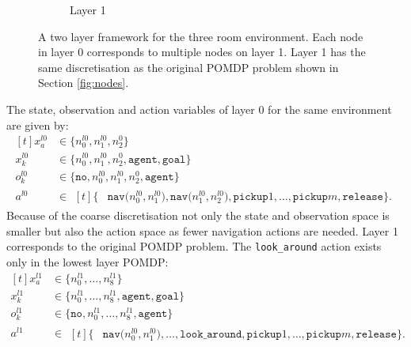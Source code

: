 \begin{figure}
\begin{subfigure}[b]{0.48\textwidth}
        \caption{Layer 1}
        \label{subfig:l1}
    \end{subfigure}
    \caption{A two layer framework for the three room environment. Each node in layer 0 corresponds to multiple nodes on layer 1. Layer 1 has the same discretisation as the original POMDP problem shown in Section \ref{fig:nodes}.}
    \label{fig:two_layers}
\end{figure}
The state, observation and action variables of layer 0 for the same environment are given by:
%
\begin{equation}\label{eq:l0}
    \begin{aligned}[t] 
        x_a^{l0} &\in \big\{n_0^{l0}, n_1^{l0}, n_2^{0}  \big\} \\
        x_k^{l0} &\in  \big\{n_0^{l0}, n_1^{l0}, n_2^{0}, \texttt{agent},\texttt{goal}  \big\}\\
        o_k^{l0} &\in \big\{\texttt{no}, n_0^{l0}, n_1^{l0}, n_2^{0}, \texttt{agent} \big\}\\
        a^{l0} &\in \begin{aligned}[t]\big\{&\texttt{nav($n_0^{l0}, n_1^{l0}$)}, \texttt{nav($n_1^{l0}, n_2^{l0}$)},\texttt{pickup}1, \ldots, \texttt{pickup}m, \texttt{release}\big\}.
        \end{aligned}
    \end{aligned}
\end{equation}
%
Because of the coarse discretisation not only the state and observation space is smaller but also the action space as fewer navigation actions are needed. Layer 1 corresponds to the original POMDP problem. The \texttt{look\_around} action exists only in the lowest layer POMDP:
%
\begin{equation}\label{eq:l1}
    \begin{aligned}[t] 
        x_a^{l1} &\in \big\{n_0^{l1}, \ldots, n_8^{l1} \big\} \\
        x_k^{l1} &\in  \big\{n_0^{l1},\ldots, n_8^{l1}, \texttt{agent},\texttt{goal}  \big\}\\
        o_k^{l1} &\in \big\{\texttt{no}, n_0^{l1},\ldots, n_8^{l1}, \texttt{agent} \big\}\\
        a^{l1} &\in \begin{aligned}[t]\big\{&\texttt{nav($n_0^{l0}, n_1^{l0}$)}, \ldots,\texttt{look\_around}, \texttt{pickup}1, \ldots, \texttt{pickup}m, \texttt{release}\big\}.
        \end{aligned}
    \end{aligned}
\end{equation}
